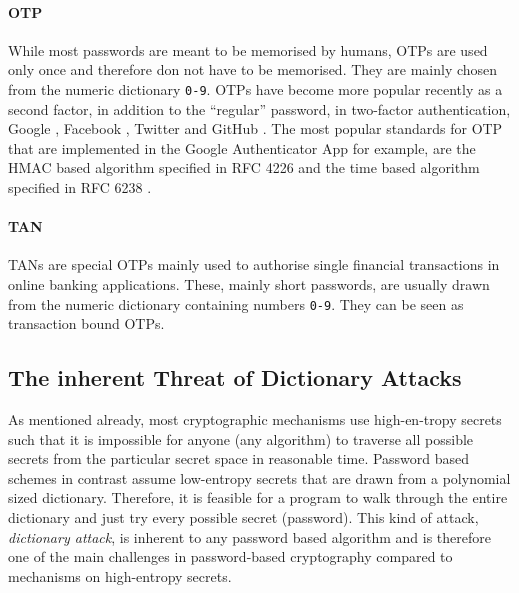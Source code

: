 \paragraph{\acl{OTP}}
While most passwords are meant to be memorised by humans, \acp{OTP} are used only once and therefore don not have to be memorised.
They are mainly chosen from the numeric dictionary \texttt{0-9}.
\acp{OTP} have become more popular recently as a second factor, in addition to the ``regular'' password, in two-factor authentication, \eg Google \cite{Google2Factor}, Facebook \cite{FB2Factor}, Twitter \cite{Twitter2Factor} and GitHub \cite{Github2Factor}.
The most popular standards for \ac{OTP} that are implemented in the Google Authenticator App \cite{GAuthenticator} for example, are the \acs{HMAC} based algorithm specified in RFC 4226 \cite{rfc4226} and the time based algorithm specified in RFC 6238 \cite{rfc6238}.

\paragraph{\acl{TAN}}
\acp{TAN} are special \acp{OTP} mainly used to authorise single financial transactions in online banking applications.
These, mainly short passwords, are usually drawn from the numeric dictionary containing numbers \texttt{0-9}.
They can be seen as transaction bound \acp{OTP}.


\subsection{The inherent Threat of Dictionary Attacks}\label{sec:introdictionaryattacks}
As mentioned already, most cryptographic mechanisms use high-en-tropy secrets such that it is impossible for anyone (any algorithm) to traverse all possible secrets from the particular secret space in reasonable time.
Password based schemes in contrast assume low-entropy secrets that are drawn from a polynomial sized dictionary.
Therefore, it is feasible for a program to walk through the entire dictionary and just try every possible secret (password).
This kind of attack, \emph{dictionary attack}, is inherent to any password based algorithm and is therefore one of the main challenges in password-based cryptography compared to mechanisms on high-entropy secrets.

